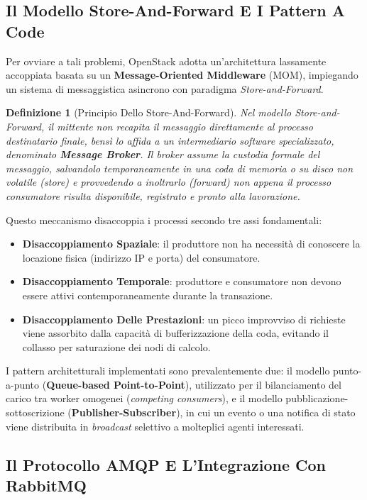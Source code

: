 \documentclass[11pt, a4paper]{article}
\newtheorem{theorem}{Definizione}
\begin{document}
\subsection{Il Modello Store-And-Forward E I Pattern A Code}

Per ovviare a tali problemi, OpenStack adotta un'architettura lassamente accoppiata basata su un \textbf{Message-Oriented Middleware} (MOM), impiegando un sistema di messaggistica asincrono con paradigma \emph{Store-and-Forward}.

\begin{theorem}[Principio Dello Store-And-Forward]
Nel modello \emph{Store-and-Forward}, il mittente non recapita il messaggio direttamente al processo destinatario finale, bensì lo affida a un intermediario software specializzato, denominato \textbf{Message Broker}. Il broker assume la custodia formale del messaggio, salvandolo temporaneamente in una coda di memoria o su disco non volatile (\emph{store}) e provvedendo a inoltrarlo (\emph{forward}) non appena il processo consumatore risulta disponibile, registrato e pronto alla lavorazione.
\end{theorem}

Questo meccanismo disaccoppia i processi secondo tre assi fondamentali:
\begin{itemize}[noitemsep]
    \item \textbf{Disaccoppiamento Spaziale}: il produttore non ha necessità di conoscere la locazione fisica (indirizzo IP e porta) del consumatore.
    \item \textbf{Disaccoppiamento Temporale}: produttore e consumatore non devono essere attivi contemporaneamente durante la transazione.
    \item \textbf{Disaccoppiamento Delle Prestazioni}: un picco improvviso di richieste viene assorbito dalla capacità di bufferizzazione della coda, evitando il collasso per saturazione dei nodi di calcolo.
\end{itemize}

I pattern architetturali implementati sono prevalentemente due: il modello punto-a-punto (\textbf{Queue-based Point-to-Point}), utilizzato per il bilanciamento del carico tra worker omogenei (\emph{competing consumers}), e il modello pubblicazione-sottoscrizione (\textbf{Publisher-Subscriber}), in cui un evento o una notifica di stato viene distribuita in \emph{broadcast} selettivo a molteplici agenti interessati.

\subsection{Il Protocollo AMQP E L'Integrazione Con RabbitMQ}
\end{document}
